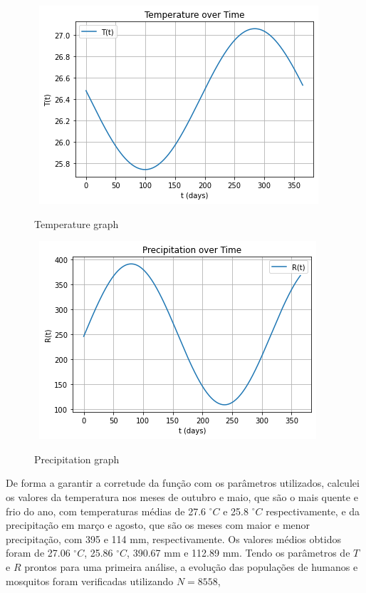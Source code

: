 \begin{figure}[!ht]
        \centering
        \hbox{\hspace{6.0em} \includegraphics[scale=0.7] {THESIS-Grafico_da_Temperatura.png}}
        \caption{Temperature graph}
\end{figure} 
\begin{figure}[!ht]
        \centering
        \hbox{\hspace{6.5em} \includegraphics[scale=0.7] {THESIS-Grafico_da_Precipitacao.png}}
        \caption{Precipitation graph}
\end{figure} 
De forma a garantir a corretude da função com os parâmetros utilizados, calculei os valores da temperatura nos meses de outubro e maio, 
que são o mais quente e frio do ano, com temperaturas médias de 27.6 $^\circ C$ e 25.8 $^\circ C$ respectivamente, e da precipitação em 
março e agosto, que são os meses com maior e menor precipitação, com 395 e 114 mm, respectivamente. Os valores médios obtidos foram de 
27.06 $^\circ C$, 25.86 $^\circ C$, 390.67 mm e 112.89 mm. Tendo os parâmetros de $T$ e $R$ prontos para uma primeira análise, a evolução 
das populações de humanos e mosquitos foram verificadas utilizando $N=8558$, 
